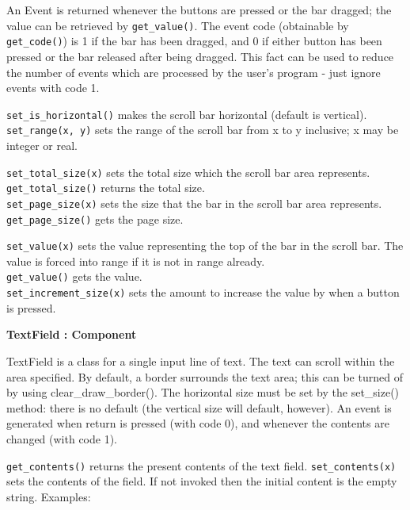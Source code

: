An Event is returned whenever the buttons are pressed or the bar
dragged; the value can be retrieved by \texttt{get\_value()}. The event code
(obtainable by \texttt{get\_code()}) is 1 if the bar has been dragged, and 0 if
either button has been pressed or the bar released after being dragged.
This fact can be used to reduce the number of events which are
processed by the user's program - just ignore events
with code 1.

\texttt{set\_is\_horizontal()} makes the scroll bar horizontal (default is
vertical).\\
\texttt{set\_range(x, y)} sets the range of the scroll bar from x to y
inclusive; x may be integer or real.

\texttt{set\_total\_size(x)} sets the total size which the scroll bar area
represents.\\
\texttt{get\_total\_size()} returns the total size.\\
\texttt{set\_page\_size(x)} sets the size that the bar in the scroll bar area
represents.\\
\texttt{get\_page\_size()} gets the page size.

\texttt{set\_value(x)} sets the value representing the top of the bar in the
scroll bar. The value is forced into range if it is not in range
already.\\
\texttt{get\_value()} gets the value.\\
\texttt{set\_increment\_size(x)} sets the amount to increase the value by when a
button is pressed.

{\ttfamily\bfseries
{}TextField : Component}

TextField is a class for a single input line of text. The text can
scroll within the area specified. By default, a border surrounds the
text area; this can be turned of by using clear\_draw\_border(). The
horizontal size must be set by the set\_size() method: there is no
default (the vertical size will default, however). An event is
generated when return is pressed (with code 0), and whenever the
contents are changed (with code 1).

\texttt{get\_contents()} returns the present contents of the text field.
\texttt{set\_contents(x)} sets the contents of the field. If not invoked then
the initial content is the empty string. Examples:


